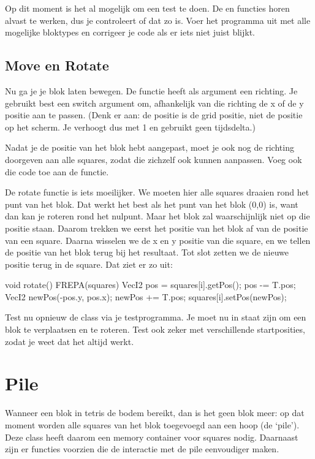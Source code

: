 Op dit moment is het al mogelijk om een test te doen. De  en  functies horen alvast te werken, dus je controleert of dat zo is. Voer het programma uit met alle mogelijke bloktypes en corrigeer je code als er iets niet juist blijkt.

\subsection{Move en Rotate}
Nu ga je je blok laten bewegen. De  functie heeft als argument een richting. Je gebruikt best een switch argument om, afhankelijk van die richting de x of de y positie aan te passen. (Denk er aan: de positie is de grid positie, niet de positie op het scherm. Je verhoogt dus met 1 en gebruikt geen tijdsdelta.)

Nadat je de positie van het blok hebt aangepast, moet je ook nog de richting doorgeven aan alle squares, zodat die zichzelf ook kunnen aanpassen. Voeg ook die code toe aan de  functie.

De rotate functie is iets moeilijker. We moeten hier alle squares draaien rond het punt van het blok. Dat werkt het best als het punt van het blok (0,0) is, want dan kan je roteren rond het nulpunt. Maar het blok zal waarschijnlijk niet op die positie staan. Daarom trekken we eerst het positie van het blok af van de positie van een square. Daarna wisselen we de x en y positie van die square, en we tellen de positie van het blok terug bij het resultaat. Tot slot zetten we de nieuwe positie terug in de square. Dat ziet er zo uit:

\begin{code}
void rotate()
{
 	 FREPA(squares)
 	 {
 		  VecI2 pos = squares[i].getPos();
 		  pos -= T.pos;
 		  VecI2 newPos(-pos.y, pos.x);
 		  newPos += T.pos;
 		  squares[i].setPos(newPos);
 	 }
}
\end{code}

Test nu opnieuw de class via je testprogramma. Je moet nu in staat zijn om een blok te verplaatsen en te roteren. Test ook zeker met verschillende startposities, zodat je weet dat het altijd werkt.


\section{Pile}
Wanneer een blok in tetris de bodem bereikt, dan is het geen blok meer: op dat moment worden alle squares van het blok toegevoegd aan een hoop (de `pile'). Deze class heeft daarom een memory container voor squares nodig. Daarnaast zijn er functies voorzien die de interactie met de pile eenvoudiger maken.

